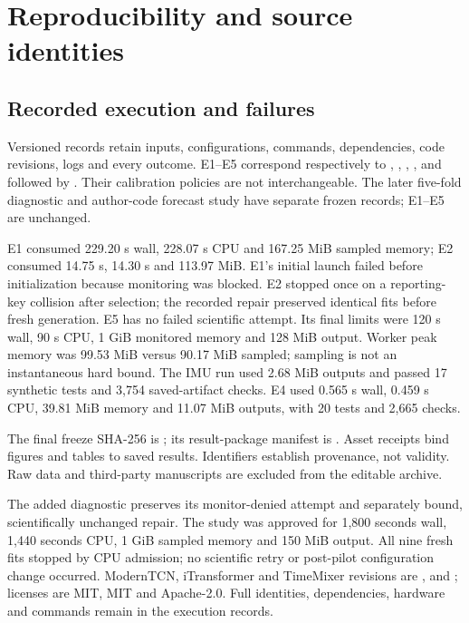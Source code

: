 \section{Reproducibility and source identities}\label{app:provenance}
\subsection{Recorded execution and failures}
Versioned records retain inputs, configurations, commands, dependencies, code revisions, logs and every outcome. E1--E5 correspond respectively to , , , , and  followed by . Their calibration policies are not interchangeable. The later five-fold diagnostic and author-code forecast study have separate frozen records; E1--E5 are unchanged.

E1 consumed 229.20 s wall, 228.07 s CPU and 167.25 MiB sampled memory; E2 consumed 14.75 s, 14.30 s and 113.97 MiB. E1's initial launch failed before initialization because monitoring was blocked. E2 stopped once on a reporting-key collision after selection; the recorded repair preserved identical fits before fresh generation. E5 has no failed scientific attempt. Its final limits were 120 s wall, 90 s CPU, 1 GiB monitored memory and 128 MiB output. Worker peak memory was 99.53 MiB versus 90.17 MiB sampled; sampling is not an instantaneous hard bound. The IMU run used 2.68 MiB outputs and passed 17 synthetic tests and 3,754 saved-artifact checks. E4 used 0.565 s wall, 0.459 s CPU, 39.81 MiB memory and 11.07 MiB outputs, with 20 tests and 2,665 checks.

The final freeze SHA-256 is ; its result-package manifest is . Asset receipts bind figures and tables to saved results. Identifiers establish provenance, not validity. Raw data and third-party manuscripts are excluded from the editable archive.

The added  diagnostic preserves its monitor-denied attempt and separately bound, scientifically unchanged repair. The  study was approved for 1,800 seconds wall, 1,440 seconds CPU, 1 GiB sampled memory and 150 MiB output. All nine fresh fits stopped by CPU admission; no scientific retry or post-pilot configuration change occurred. ModernTCN, iTransformer and TimeMixer revisions are ,  and ; licenses are MIT, MIT and Apache-2.0. Full identities, dependencies, hardware and commands remain in the execution records.

